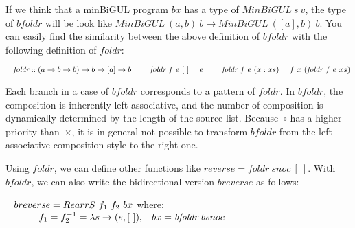 If we think that a minBiGUL program $bx$ has a type of $\textit{MinBiGUL} \ s \ v$, the type of $bfoldr$ will be look like $\textit{MinBiGUL} \ (a, b) \ b \to \textit{MinBiGUL} \ ([a], b) \ b$. You can easily find the similarity between the above definition of $\textit{bfoldr}$ with the following definition of $\textit{foldr}$:

\smallvspace
$\tab \textit{foldr} :: (a \to b \to b) \to b \to [a] \to b \\
\tabs{2} \ \ \textit{foldr} \ f \ e \ [\ ] = e \\ 
\tabs{2} \ \ \textit{foldr} \ f \ e \ (x:xs) = f \ x \ (\textit{foldr} \ f \ e \ xs)$
\smallvspace

Each branch in a case of $\textit{bfoldr}$ corresponds to a pattern of $foldr$. In $\textit{bfoldr}$, the composition is inherently left associative, and the number of composition is dynamically determined by the length of the source list. Because~$\circ$ has a higher priority than~$\times$, it is in general not possible to transform $\textit{bfoldr}$ from the left associative composition style to the right one. 

Using $\textit{foldr}$, we can define other functions like $reverse = \textit{foldr} \ snoc \ [\ ]$. With $\textit{bfoldr}$, we can also write the bidirectional version $breverse$ as follows:

\smallvspace
$\tab breverse = RearrS \ f_1 \ f_2 \ bx$ where: \\
$\tabs{4} f_1 = f_2^{-1} = \lambda s \to (s, [\ ]), \tab bx = \textit{bfoldr} \ bsnoc$
